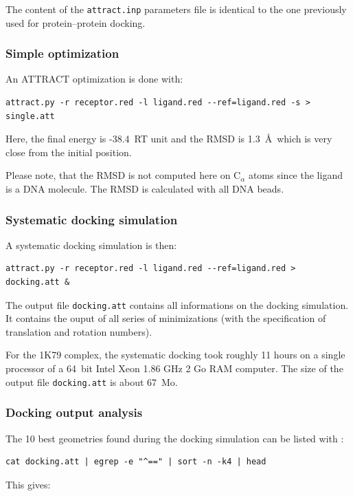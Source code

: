 \documentclass[12pt,a4paper]{article}
\begin{document}
The content of the {\tt attract.inp} parameters file is identical to the one
previously used for protein--protein docking.

\subsubsection{Simple optimization}

An ATTRACT optimization is done with:
\begin{verbatim}
attract.py -r receptor.red -l ligand.red --ref=ligand.red -s > single.att
\end{verbatim}

Here, the final energy is -38.4~RT unit and the RMSD is 1.3~\AA\ which is very close
from the initial position.

Please note, that the RMSD is not computed here on C$_{\alpha}$ atoms since the
ligand is a DNA molecule. The RMSD is calculated with all DNA beads. 

\subsubsection{Systematic docking simulation}

A systematic docking simulation is then:
\begin{verbatim}
attract.py -r receptor.red -l ligand.red --ref=ligand.red > docking.att &
\end{verbatim}

The output file {\tt docking.att} contains all informations on the docking 
simulation. It contains the ouput of all series of minimizations 
(with the specification of translation and rotation numbers).

For the 1K79 complex, the systematic docking took roughly 11 hours on a single processor of a 64~bit Intel Xeon 1.86 GHz 2 Go RAM computer.
The size of the output file {\tt docking.att} is about 67~Mo.

\subsubsection{Docking output analysis}

The 10 best geometries found during the docking simulation can be listed with :

\begin{verbatim}
cat docking.att | egrep -e "^==" | sort -n -k4 | head
\end{verbatim}

This gives:
\end{document}
